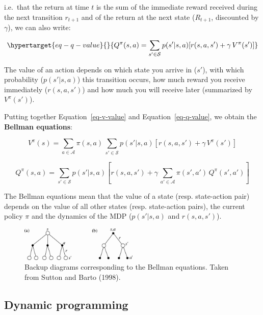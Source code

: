 \documentclass[
  letterpaper,
  DIV=11,
  numbers=noendperiod]{scrreprt}
\begin{document}
i.e.~that the return at time \(t\) is the sum of the immediate reward
received during the next transition \(r_{t+1}\) and of the return at the
next state (\(R_{t+1}\), discounted by \(\gamma\)), we can also write:

\begin{equation}\protect\hypertarget{eq-q-value}{}{
    Q^{\pi}(s, a) = \sum_{s' \in \mathcal{S}} p(s'|s, a) [r(s, a, s') + \gamma \, V^\pi(s')]
}\label{eq-q-value}\end{equation}

The value of an action depends on which state you arrive in (\(s'\)),
with which probability (\(p(s'|s, a)\)) this transition occurs, how much
reward you receive immediately (\(r(s, a, s')\)) and how much you will
receive later (summarized by \(V^\pi(s')\)).

Putting together Equation~\ref{eq-v-value} and
Equation~\ref{eq-q-value}, we obtain the \textbf{Bellman equations}:

\[
    V^{\pi}(s) = \sum_{a \in \mathcal{A}} \pi(s, a) \, \sum_{s' \in \mathcal{S}} p(s'|s, a) [r(s, a, s') + \gamma \, V^\pi(s')]
\]

\[
    Q^{\pi}(s, a) = \sum_{s' \in \mathcal{S}} p(s'|s, a) [r(s, a, s') + \gamma \, \sum_{a' \in \mathcal{A}} \pi(s', a') \, Q^\pi(s',a')]
\]

The Bellman equations mean that the value of a state (resp. state-action
pair) depends on the value of all other states (resp. state-action
pairs), the current policy \(\pi\) and the dynamics of the MDP
(\(p(s'|s, a)\) and \(r(s, a, s')\)).

\begin{figure}

{\centering \includegraphics[width=0.5\textwidth,height=\textheight]{./img/backup.png}

}

\caption{\label{fig-backup}Backup diagrams corresponding to the Bellman
equations. Taken from Sutton and Barto (1998).}

\end{figure}

\hypertarget{dynamic-programming}{%
\subsection{Dynamic programming}\label{dynamic-programming}}
\end{document}
